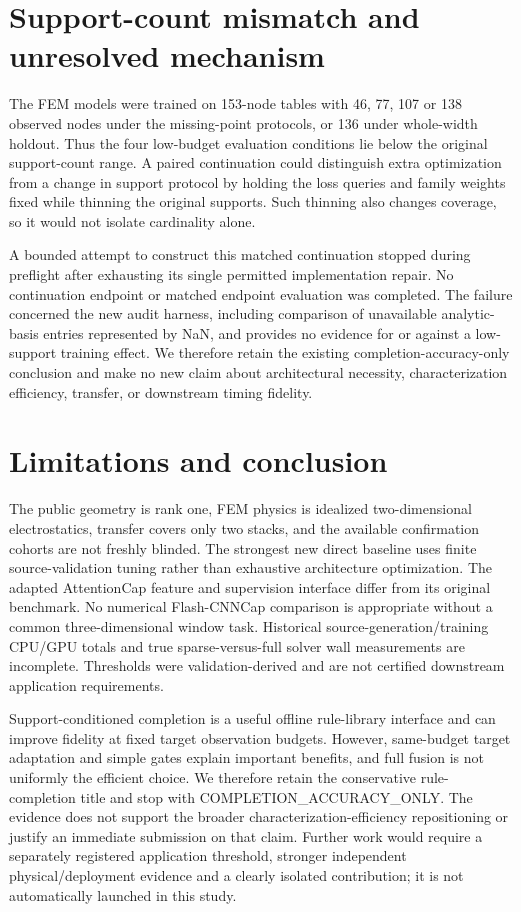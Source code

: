 \documentclass[10pt,twocolumn]{article}
\begin{document}
\section*{Support-count mismatch and unresolved mechanism}

The FEM models were trained on 153-node tables with 46, 77, 107 or 138 observed nodes under the missing-point protocols, or 136 under whole-width holdout. Thus the four low-budget evaluation conditions lie below the original support-count range. A paired continuation could distinguish extra optimization from a change in support protocol by holding the loss queries and family weights fixed while thinning the original supports. Such thinning also changes coverage, so it would not isolate cardinality alone.

A bounded attempt to construct this matched continuation stopped during preflight after exhausting its single permitted implementation repair. No continuation endpoint or matched endpoint evaluation was completed. The failure concerned the new audit harness, including comparison of unavailable analytic-basis entries represented by NaN, and provides no evidence for or against a low-support training effect. We therefore retain the existing completion-accuracy-only conclusion and make no new claim about architectural necessity, characterization efficiency, transfer, or downstream timing fidelity.

\section*{Limitations and conclusion}

The public geometry is rank one, FEM physics is idealized two-dimensional electrostatics, transfer covers only two stacks, and the available confirmation cohorts are not freshly blinded. The strongest new direct baseline uses finite source-validation tuning rather than exhaustive architecture optimization. The adapted AttentionCap feature and supervision interface differ from its original benchmark. No numerical Flash-CNNCap comparison is appropriate without a common three-dimensional window task. Historical source-generation/training CPU/GPU totals and true sparse-versus-full solver wall measurements are incomplete. Thresholds were validation-derived and are not certified downstream application requirements.

Support-conditioned completion is a useful offline rule-library interface and can improve fidelity at fixed target observation budgets. However, same-budget target adaptation and simple gates explain important benefits, and full fusion is not uniformly the efficient choice. We therefore retain the conservative rule-completion title and stop with COMPLETION\_ACCURACY\_ONLY. The evidence does not support the broader characterization-efficiency repositioning or justify an immediate submission on that claim. Further work would require a separately registered application threshold, stronger independent physical/deployment evidence and a clearly isolated contribution; it is not automatically launched in this study.
\end{document}
